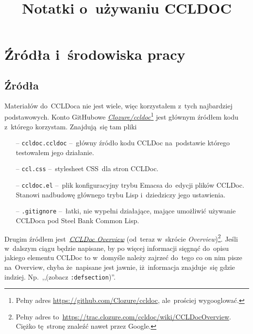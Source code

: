 \documentclass[a4paper,11pt]{article}  %
\title{Notatki o~używaniu CCLDOC}
\begin{document}


\lstset{language=Lisp}


\maketitle %

\tableofcontents





\section{Źródła i~środowiska pracy}


\subsection{Źródła}

Materiałów do~CCLDoca nie jest wiele, więc korzystałem z~tych
najbardziej podstawowych. Konto GitHubowe
\href{https://github.com/Clozure/ccldoc}
{\emph{Clozure/ccldoc}}\footnote{Pełny adres
  \href{https://github.com/Clozure/ccldoc}
  {https://github.com/Clozure/ccldoc}, ale~prościej wygooglować.} jest
głównym źródłem kodu z~którego korzystam. Znajdują~się tam pliki
\begin{itemize}
\item[--] \verb+ccldoc.ccldoc+ --~główny źródło kodu CCLDoc
  na~podstawie którego testowałem jego działanie.
\item[--] \verb+ccl.css+ --~stylesheet CSS~dla stron CCLDoc.
\item[--] \verb+ccldoc.el+ --~plik konfiguracyjny trybu Emacsa
  do~edycji plików CCLDoc. Stanowi nadbudowę głównego trybu Lisp
  i~dziedziczy jego ustawienia.
\item[--] \verb+.gitignore+ --~łatki, nie wypełni działające, mające
  umożliwić używanie CCLDoca pod Steel Bank Common Lisp.
\end{itemize}

Drugim źródłem jest~\href{https://trac.clozure.com/ccldoc/wiki}{\emph{CCLDoc
  Overview}} (od~teraz w~skrócie
\emph{Overview})\footnote{Pełny adres
  to~\href{https://trac.clozure.com/ccldoc/wiki/CCLDocOverview}
  {https://trac.clozure.com/ccldoc/wiki/CCLDocOverview}. Ciężko
  tę~stronę znaleźć nawet przez Google.}. Jeśli w~dalszym ciągu będzie napisane, by po więcej
informacji sięgnąć do~opisu jakiego elementu CCLDoc to w~domyśle
należy zajrzeć do~tego co on nim pisze na~Overview, chyba że~napisane
jest jawnie, iż~informacja znajduje~się gdzie indziej. Np.~,,(zobacz
\verb+:defsection+)''.
\end{document}
